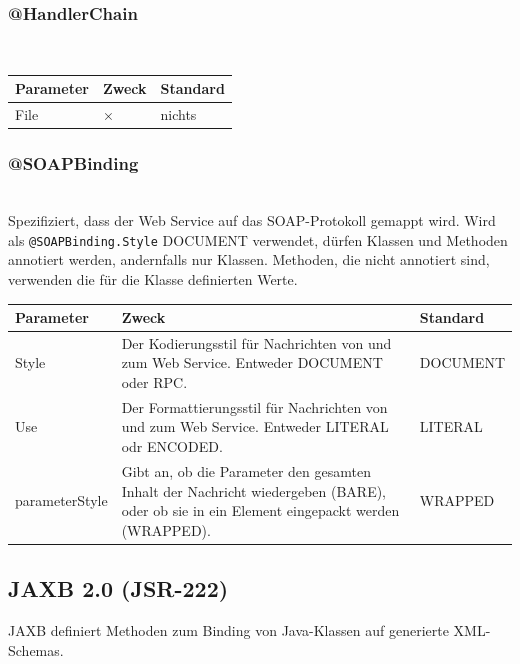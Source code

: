 \documentclass[runningheads]{llncs}
\newcommand{\germanquote}[1]{\glqq{}#1\grqq{}}
\newcommand{\anntabwidth}{\textwidth}
\begin{document}
    \subsubsection{@HandlerChain}\ \\
    \begin{tabulary}{\anntabwidth}{|l|L|L|}
    \hline
    \textbf{Parameter} & \textbf{Zweck} & \textbf{Standard} \\
    \hline
      File &
      × &
      nichts \\
    \hline
    \end{tabulary}

    \subsubsection{@SOAPBinding}\ \\
      Spezifiziert, dass der Web Service auf das SOAP-Protokoll gemappt wird. Wird als \texttt{@SOAPBinding.Style} \germanquote{DOCUMENT} verwendet, dürfen Klassen und Methoden annotiert werden, andernfalls nur Klassen. Methoden, die nicht annotiert sind, verwenden die für die Klasse definierten Werte. \\
    \tymin=75pt
    \begin{tabulary}{\anntabwidth}{|l|L|L|}
    \hline
    \textbf{Parameter} & \textbf{Zweck} & \textbf{Standard} \\
    \hline
      Style &
      Der Kodierungsstil für Nachrichten von und zum Web Service. Entweder \germanquote{DOCUMENT} oder \germanquote{RPC}. &
      DOCUMENT \\
    \hline
      Use &
      Der Formattierungsstil für Nachrichten von und zum Web Service. Entweder \germanquote{LITERAL} odr \germanquote{ENCODED}. &
      LITERAL \\
    \hline
      parameterStyle &
      Gibt an, ob die Parameter den gesamten Inhalt der Nachricht wiedergeben (\germanquote{BARE}), oder ob sie in ein Element eingepackt werden (\germanquote{WRAPPED}). &
      WRAPPED \\
    \hline
    \end{tabulary}
    \tymin=10pt



  \label{jsr222}
  \subsection{JAXB 2.0 (JSR-222)}
  JAXB\cite{jsr_222} definiert Methoden zum Binding von Java-Klassen auf generierte XML-Schemas.
\end{document}
